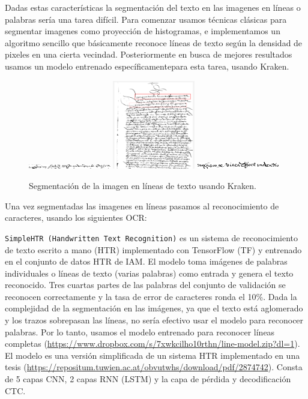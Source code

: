 \documentclass[11pt,a4paper]{article}
\begin{document}
Dadas estas características la segmentación del texto en las imagenes en líneas o palabras sería una tarea difícil. Para comenzar usamos técnicas clásicas para segmentar imagenes como proyección de histogramas, e implementamos un algoritmo sencillo que básicamente reconoce líneas de texto según la densidad de pixeles en una cierta vecindad. Posteriormente en busca de mejores resultados usamos un modelo entrenado específicamentepara esta tarea, usando Kraken.

\begin{figure}[h] 
  \centering 
  \begin{minipage}{1.0\textwidth} 
  \includegraphics[width=0.32\textwidth]{line_1.png} 
  \includegraphics[width=0.32\textwidth]{kraken_segmentation.png} 
  \includegraphics[width=0.32\textwidth]{line_3.png} 
  \caption{Segmentación de la imagen en líneas de texto usando Kraken.} 
  \label{fig:tresfotosmodelo} 
  \end{minipage} 
  \end{figure} 

Una vez segmentadas las imagenes en líneas pasamos al reconocimiento de caracteres, usando los siguientes OCR:

\texttt{SimpleHTR (Handwritten Text Recognition)} es un sistema de reconocimiento de texto escrito a mano (HTR) implementado con TensorFlow (TF) y entrenado en el conjunto de datos HTR de IAM. El modelo toma imágenes de palabras individuales o líneas de texto (varias palabras) como entrada y genera el texto reconocido. Tres cuartas partes de las palabras del conjunto de validación se reconocen correctamente y la tasa de error de caracteres ronda el 10\%. Dada la complejidad de la segmentación en las imágenes, ya que el texto está aglomerado y los trazos sobrepasan las líneas, no sería efectivo usar el modelo para reconocer palabras. Por lo tanto, usamos el modelo entrenado para reconocer líneas completas (\url{https://www.dropbox.com/s/7xwkcilho10rthn/line-model.zip?dl=1}). El modelo es una versión simplificada de un sistema HTR implementado en una tesis (\url{https://repositum.tuwien.ac.at/obvutwhs/download/pdf/2874742}). Consta de 5 capas CNN, 2 capas RNN (LSTM) y la capa de pérdida y decodificación CTC.
\end{document}
